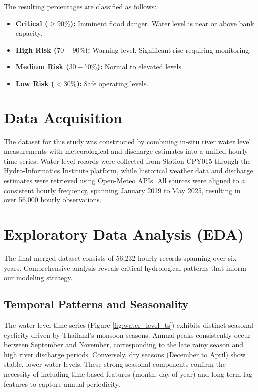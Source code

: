 The resulting percentages are classified as follows:
\begin{itemize}
    \item \textbf{Critical ($\ge 90\%$):} Imminent flood danger. Water level is near or above bank capacity.
    \item \textbf{High Risk ($70-90\%$):} Warning level. Significant rise requiring monitoring.
    \item \textbf{Medium Risk ($30-70\%$):} Normal to elevated levels.
    \item \textbf{Low Risk ($< 30\%$):} Safe operating levels.
\end{itemize}

\section{Data Acquisition}

The dataset for this study was constructed by combining in-situ river water level measurements with meteorological and discharge estimates into a unified hourly time series. Water level records were collected from Station CPY015 through the Hydro-Informatics Institute platform, while historical weather data and discharge estimates were retrieved using Open-Meteo APIs. All sources were aligned to a consistent hourly frequency, spanning January 2019 to May 2025, resulting in over 56,000 hourly observations.

\section{Exploratory Data Analysis (EDA)}

The final merged dataset consists of 56,232 hourly records spanning over six years. Comprehensive analysis reveals critical hydrological patterns that inform our modeling strategy.

\subsection{Temporal Patterns and Seasonality}
The water level time series (Figure \ref{fig:water_level_ts}) exhibits distinct seasonal cyclicity driven by Thailand's monsoon seasons. Annual peaks consistently occur between September and November, corresponding to the late rainy season and high river discharge periods. Conversely, dry seasons (December to April) show stable, lower water levels. These strong seasonal components confirm the necessity of including time-based features (month, day of year) and long-term lag features to capture annual periodicity.

